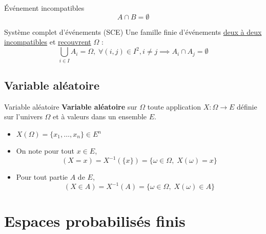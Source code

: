 \begin{Definition}[colbacktitle=red!75!black]{Événement incompatibles}{}
\begin{equation}
  A \cap B = \emptyset
\end{equation}
\end{Definition}

\begin{Definition}[colbacktitle=red!75!black]{Système complet d'événements (SCE)}{}
Une famille finie d'événements \underline{deux à deux incompatibles} et \underline{recouvrent} $\Omega$ : 
\begin{equation}
  \bigcup _{i \in I} A_i = \Omega, \; \forall (i,j) \in I ^{2}, i \ne j \implies A_i \cap A_j = \emptyset
\end{equation}
\end{Definition}

\subsection{Variable aléatoire} %
\label{sub:Variable aléatoire}

\begin{Definition}[colbacktitle=red!75!black]{Variable aléatoire}{}
\textbf{Variable aléatoire} sur $\Omega$ toute application $X: \Omega \to E$ définie sur l'univers $\Omega$ et à valeurs dans un ensemble $E$.

\begin{itemize}

  \item $X(\Omega) = \{ x_1, \dots, x_n\} \in E ^{n}$
  \item On note pour tout $x \in E$,
\begin{equation}
(X =x) = X ^{-1}(\{x\}) = \{ \omega \in \Omega, \; X(\omega) = x \}
\end{equation}
\item Pour tout partie $A$ de $E$,
\begin{equation}
  (X \in A) = X ^{-1}(A) = \{ \omega \in \Omega, \; X(\omega)\in A\}
\end{equation}

\end{itemize}
\end{Definition}


\section{Espaces probabilisés finis} %
\label{sec:Espaces probabilisés finis}

